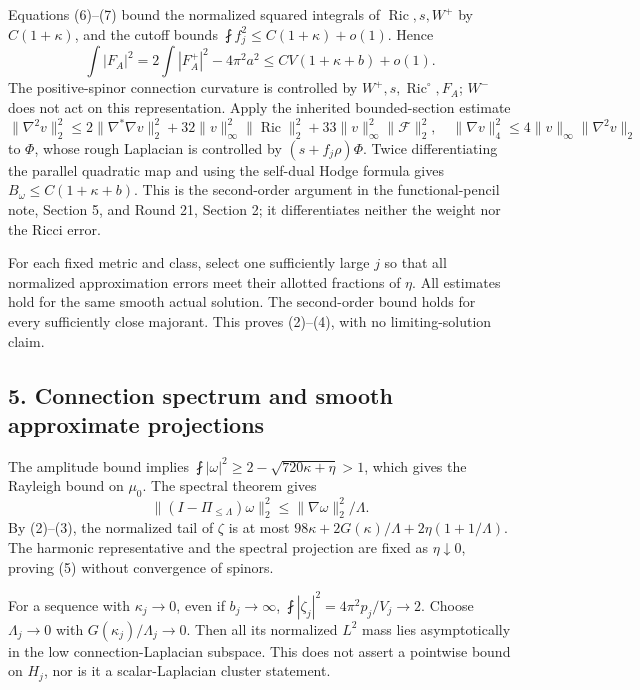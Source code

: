 \documentclass[
  11pt,
]{article}
\begin{document}
Equations (6)--(7) bound the normalized squared integrals of
\(\operatorname{Ric},s,W^+\) by \(C(1+\kappa)\), and the cutoff bounds
\(\fint f_j^2\le C(1+\kappa)+o(1)\). Hence \[
 \int|F_A|^2=2\int|F_A^+|^2-4\pi^2a^2
 \le CV(1+\kappa+b)+o(1).
\] The positive-spinor connection curvature is controlled by
\(W^+,s,\operatorname{Ric}^{\circ},F_A\); \(W^-\) does not act on this
representation. Apply the inherited bounded-section estimate \[
 \|\nabla^2v\|_2^2\le2\|\nabla^*\nabla v\|_2^2
 +32\|v\|_\infty^2\|\operatorname{Ric}\|_2^2
 +33\|v\|_\infty^2\|\mathscr F\|_2^2,
 \quad \|\nabla v\|_4^2\le4\|v\|_\infty\|\nabla^2v\|_2
\] to \(\Phi\), whose rough Laplacian is controlled by
\((s+f_j\rho)\Phi\). Twice differentiating the parallel quadratic map
and using the self-dual Hodge formula gives
\(B_\omega\le C(1+\kappa+b)\). This is the second-order argument in the
functional-pencil note, Section 5, and Round 21, Section 2; it
differentiates neither the weight nor the Ricci error.

For each fixed metric and class, select one sufficiently large \(j\) so
that all normalized approximation errors meet their allotted fractions
of \(\eta\). All estimates hold for the same smooth actual solution. The
second-order bound holds for every sufficiently close majorant. This
proves (2)--(4), with no limiting-solution claim.

\hypertarget{connection-spectrum-and-smooth-approximate-projections}{%
\subsection{5. Connection spectrum and smooth approximate
projections}\label{connection-spectrum-and-smooth-approximate-projections}}

The amplitude bound implies
\(\fint|\omega|^2\ge2-\sqrt{720\kappa+\eta}>1\), which gives the
Rayleigh bound on \(\mu_0\). The spectral theorem gives \[
 \|(I-\Pi_{\le\Lambda})\omega\|_2^2
 \le\|\nabla\omega\|_2^2/\Lambda.
\] By (2)--(3), the normalized tail of \(\zeta\) is at most
\(98\kappa+2G(\kappa)/\Lambda+2\eta(1+1/\Lambda)\). The harmonic
representative and the spectral projection are fixed as
\(\eta\downarrow0\), proving (5) without convergence of spinors.

For a sequence with \(\kappa_j\to0\), even if \(b_j\to\infty\),
\(\fint|\zeta_j|^2=4\pi^2p_j/V_j\to2\). Choose \(\Lambda_j\to0\) with
\(G(\kappa_j)/\Lambda_j\to0\). Then all its normalized \(L^2\) mass lies
asymptotically in the low connection-Laplacian subspace. This does not
assert a pointwise bound on \(H_j\), nor is it a scalar-Laplacian
cluster statement.
\end{document}
